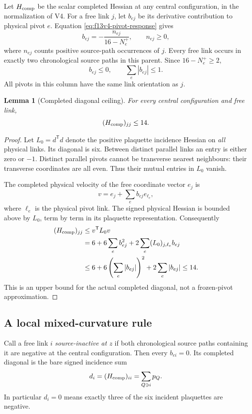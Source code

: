 \documentclass[11pt,oneside]{article}
\newtheorem{lemma}[theorem]{Lemma}
\begin{document}
Let \(H_{\rm comp}\) be the scalar completed
Hessian at any central configuration, in the
normalization of V4. For a free link \(j\), let
\(b_{ej}\) be its derivative contribution to
physical pivot \(e\). Equation
\eqref{eq:f13v4-pivot-response} gives
\[
 b_{ej}=-\frac{n_{ej}}{16-N_e^+},\qquad
 n_{ej}\ge0 ,
\]
where \(n_{ej}\) counts positive source-path
occurrences of \(j\). Every free link occurs
in exactly two chronological source paths in
this parent. Since \(16-N_e^+\ge2\),
\begin{equation}\label{eq:f13v6-column}
 b_{ej}\le0,\qquad \sum_e|b_{ej}|\le1 .
\end{equation}
All pivots in this column have the same link
orientation as \(j\).

\begin{lemma}[Completed diagonal ceiling]
\label{lem:f13v6-diagonal}
For every central configuration and free link,
\[
 (H_{\rm comp})_{jj}\le14.
\]
\end{lemma}

\begin{proof}
Let \(L_0=d^{\mathsf T}d\) denote the positive
plaquette incidence Hessian on \emph{all} physical
links. Its diagonal is six. Between distinct
parallel links an entry is either zero or \(-1\).
Distinct parallel pivots cannot be transverse
nearest neighbours: their transverse coordinates
are all even. Thus their mutual entries in
\(L_0\) vanish.

The completed physical velocity of the free
coordinate vector \(e_j\) is
\[
 v=e_j+\sum_e b_{ej}e_{\ell_e},
\]
where \(\ell_e\) is the physical pivot link.
The signed physical Hessian is bounded above
by \(L_0\), term by term in its plaquette
representation. Consequently
\begin{align*}
 (H_{\rm comp})_{jj}
 &\le v^{\mathsf T}L_0v\\
 &=6+6\sum_e b_{ej}^2
      +2\sum_e(L_0)_{j,\ell_e}b_{ej}\\
 &\le6+6\left(\sum_e|b_{ej}|\right)^2
             +2\sum_e|b_{ej}|\le14 .
\end{align*}
This is an upper bound for the actual completed
diagonal, not a frozen-pivot approximation.
\end{proof}

\subsection{A local mixed-curvature rule}

Call a free link \(i\) \emph{source-inactive at \(z\)}
if both chronological source paths containing it
are negative at the central configuration. Then
every \(b_{ei}=0\). Its completed diagonal is the
bare signed incidence sum
\[
 d_i=(H_{\rm comp})_{ii}=\sum_{Q\ni i}p_Q.
\]
In particular \(d_i=0\) means exactly three of
the six incident plaquettes are negative.
\end{document}
